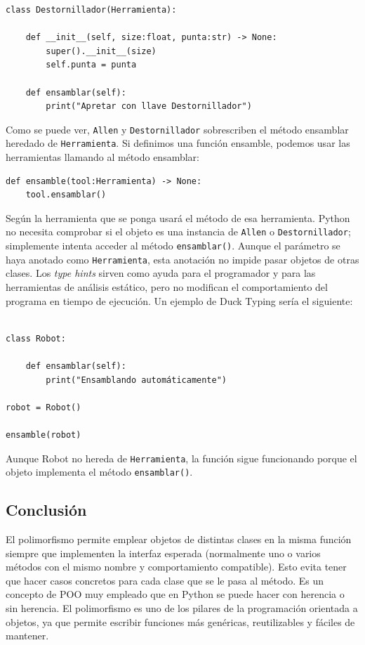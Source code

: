 \documentclass[11pt,a5paper,twoside]{book}
\begin{document}
\begin{tcolorbox}
\scriptsize
 \begin{verbatim}
class Destornillador(Herramienta):

    def __init__(self, size:float, punta:str) -> None:
        super().__init__(size)
        self.punta = punta

    def ensamblar(self):
        print("Apretar con llave Destornillador")
\end{verbatim}
\end{tcolorbox}
Como se puede ver, {\scriptsize \texttt{Allen}} y {\scriptsize \texttt{Destornillador}} sobrescriben el método ensamblar heredado de {\scriptsize \texttt{Herramienta}}. Si definimos una función ensamble, podemos usar las herramientas llamando al método ensamblar:


\begin{tcolorbox}
\scriptsize
 \begin{verbatim}
def ensamble(tool:Herramienta) -> None:
    tool.ensamblar()
\end{verbatim}
\end{tcolorbox}
Según la herramienta que se ponga usará el método de esa herramienta. Python no necesita comprobar si el objeto es una instancia de {\scriptsize \texttt{Allen}} o {\scriptsize \texttt{Destornillador}}; simplemente intenta acceder al método {\scriptsize \texttt{ensamblar()}}.
Aunque el parámetro se haya anotado como {\scriptsize \texttt{Herramienta}}, esta anotación no impide pasar objetos de otras clases. Los \textit{type hints} sirven como ayuda para el programador y para las herramientas de análisis estático, pero no modifican el comportamiento del programa en tiempo de ejecución.
Un ejemplo de Duck Typing sería el siguiente:


\begin{tcolorbox}
\scriptsize
 \begin{verbatim}

class Robot:

    def ensamblar(self):
        print("Ensamblando automáticamente")

robot = Robot()

ensamble(robot)
\end{verbatim}
\end{tcolorbox}
Aunque Robot no hereda de {\scriptsize \texttt{Herramienta}}, la función sigue funcionando porque el objeto implementa el método {\scriptsize \texttt{ensamblar()}}.
\subsection{Conclusión}
El polimorfismo permite emplear objetos de distintas clases en la misma función siempre que implementen la interfaz esperada (normalmente uno o varios métodos con el mismo nombre y comportamiento compatible). Esto evita tener que hacer casos concretos para cada clase que se le pasa al método.
Es un concepto de POO muy empleado que en Python se puede hacer con herencia o sin herencia.
El polimorfismo es uno de los pilares de la programación orientada a objetos, ya que permite escribir funciones más genéricas, reutilizables y fáciles de mantener.
\end{document}
